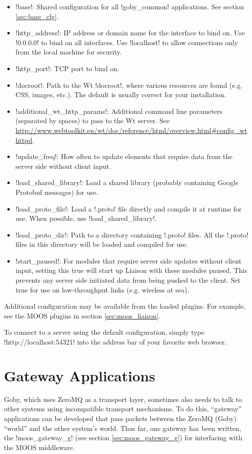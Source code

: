 \begin{itemize}
\item !base!: Shared configuration for all !goby_common! applications. See section \ref{sec:base_cfg}.
\item !http_address!: IP address or domain name for the interface to bind on. Use !0.0.0.0! to bind on all interfaces. Use !localhost! to allow connections only from the local machine for security.
\item !http_port!: TCP port to bind on.
\item !docroot!: Path to the Wt !docroot!, where various resources are found (e.g. CSS, images, etc.). The default is usually correct for your installation.
\item !additional_wt_http_params!: Additional command line parameters (separated by spaces) to pass to the Wt server. See \url{http://www.webtoolkit.eu/wt/doc/reference/html/overview.html#config_wthttpd}.
\item !update_freq!: How often to update elements that require data from the server side without client input.
\item !load_shared_library!: Load a shared library (probably containing Google Protobuf messages) for use.
\item !load_proto_file!: Load a !.proto! file directly and compile it at runtime for use. When possible, use !load_shared_library!.
\item !load_proto_dir!: Path to a directory containing !.proto! files. All the !.proto! files in this directory will be loaded and compiled for use.
\item !start_paused!: For modules that require server side updates without client input, setting this true will start up Liaison with these modules paused. This prevents any server side initiated data from being pushed to the client. Set true for use on low-throughput links (e.g. wireless at sea).
\end{itemize}

Additional configuration may be available from the loaded plugins. For example, see the MOOS plugins in section \ref{sec:moos_liaison}.

To connect to a server using the default configuration, simply type !http://localhost:54321! into the address bar of your favorite web browser.

\section{Gateway Applications}

Goby, which uses ZeroMQ as a transport layer, sometimes also needs to talk to other systems using incompatible transport mechanisms. To do this, ``gateway'' applications can be developed that pass packets between the ZeroMQ (Goby) ``world'' and the other system's world. Thus far, one gateway has been written, the !moos_gateway_g! (see section \ref{sec:moos_gateway_g}) for interfacing with the MOOS middleware.
